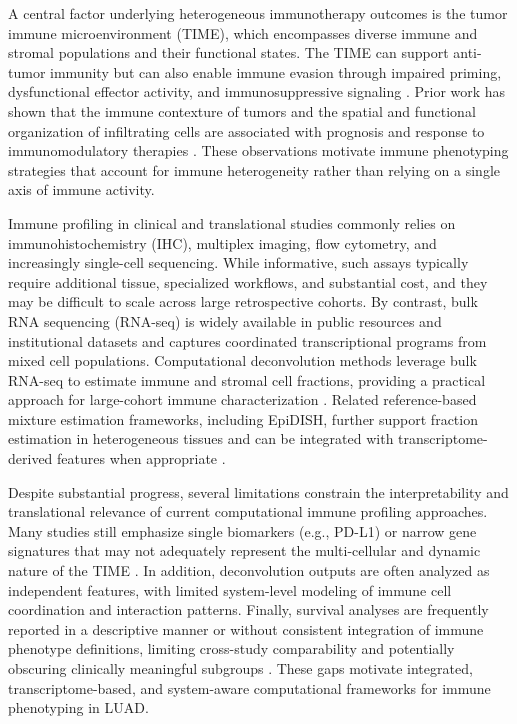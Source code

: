 \documentclass[conference]{IEEEtran}
\begin{document}
A central factor underlying heterogeneous immunotherapy outcomes is the tumor immune microenvironment (TIME), which encompasses diverse immune and stromal populations and their functional states.
The TIME can support anti-tumor immunity but can also enable immune evasion through impaired priming, dysfunctional effector activity, and immunosuppressive signaling \cite{ChenMellman2013,ChenMellman2017}.
Prior work has shown that the immune contexture of tumors and the spatial and functional organization of infiltrating cells are associated with prognosis and response to immunomodulatory therapies \cite{Fridman2017,Spranger2016}.
These observations motivate immune phenotyping strategies that account for immune heterogeneity rather than relying on a single axis of immune activity.

Immune profiling in clinical and translational studies commonly relies on immunohistochemistry (IHC), multiplex imaging, flow cytometry, and increasingly single-cell sequencing.
While informative, such assays typically require additional tissue, specialized workflows, and substantial cost, and they may be difficult to scale across large retrospective cohorts.
By contrast, bulk RNA sequencing (RNA-seq) is widely available in public resources and institutional datasets and captures coordinated transcriptional programs from mixed cell populations.
Computational deconvolution methods leverage bulk RNA-seq to estimate immune and stromal cell fractions, providing a practical approach for large-cohort immune characterization \cite{Newman2015,Finotello2019,Racle2017,Li2017,Becht2016}.
Related reference-based mixture estimation frameworks, including EpiDISH, further support fraction estimation in heterogeneous tissues and can be integrated with transcriptome-derived features when appropriate \cite{Zheng2017EpiDISH}.

Despite substantial progress, several limitations constrain the interpretability and translational relevance of current computational immune profiling approaches.
Many studies still emphasize single biomarkers (e.g., PD-L1) or narrow gene signatures that may not adequately represent the multi-cellular and dynamic nature of the TIME \cite{SharmaAllison2015,ChenMellman2017}.
In addition, deconvolution outputs are often analyzed as independent features, with limited system-level modeling of immune cell coordination and interaction patterns.
Finally, survival analyses are frequently reported in a descriptive manner or without consistent integration of immune phenotype definitions, limiting cross-study comparability and potentially obscuring clinically meaningful subgroups \cite{Fridman2017,Cox1972}.
These gaps motivate integrated, transcriptome-based, and system-aware computational frameworks for immune phenotyping in LUAD.
\end{document}
